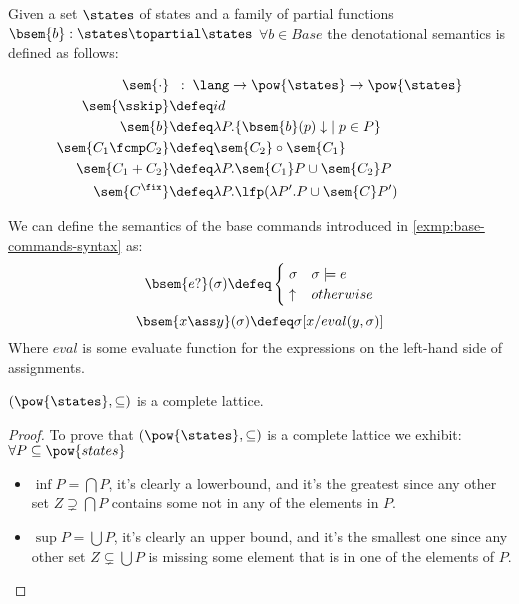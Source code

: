 \begin{definition}
  Given a set $\states$ of states and a family of partial functions 
  $\bsem{b} : \states \topartial \states$ $\forall b \in Base$ the denotational 
  semantics is defined as follows:

  \begin{align*}
      \sem{\cdot}         & \;\;:\; \lang \to \pow{\states} \to \pow{\states} \\
      \sem{\sskip}        &\defeq id \\
      \sem{b}             &\defeq \lambda P . \{ \bsem{b}(p)\downarrow \; \mid 
        p \in P \} \\
      \sem{C_1 \fcmp C_2} &\defeq \sem{C_2} \circ \sem{C_1} \\
      \sem{C_1 + C_2}     &\defeq \lambda P . \sem{C_1} P \cup \sem{C_2} P \\
      \sem{C^\fix}        &\defeq \lambda P . \lfp(\lambda P'. P \cup \sem{C} P')
  \end{align*}

  \begin{example}
    We can define the semantics of the base commands introduced in 
    \ref{exmp:base-commands-syntax} as:
    $$\bsem{e ?}(\sigma) \defeq \begin{cases}
      \; \sigma & \sigma \models e \\
      \; \uparrow & otherwise
    \end{cases}$$
    $$\bsem{x \ass y}(\sigma) \defeq \sigma[x/eval(y, \sigma)]$$
    Where $eval$ is some evaluate function for the expressions on the left-hand
    side of assignments.
  \end{example}

  \begin{theorem}
    \label{thm:sem-lattice}
    $(\pow{\states}, \subseteq)$ is a complete lattice.
  \end{theorem}
  \begin{proof}
    To prove that $(\pow{\states}, \subseteq)$ is a complete lattice we exhibit:
    $\forall P \subseteq \pow{states}$
    \begin{itemize}
      \item $\inf P = \bigcap P$, it's clearly a lowerbound, and it's the 
        greatest since any other set $Z \supsetneq \bigcap P$ contains some
        not in any of the elements in $P$.
      \item $\sup P = \bigcup P$, it's clearly an upper bound, and it's the
        smallest one since any other set $Z \subsetneq \bigcup P$ is missing
        some element that is in one of the elements of $P$.
    \end{itemize}
  \end{proof}


\end{definition}

